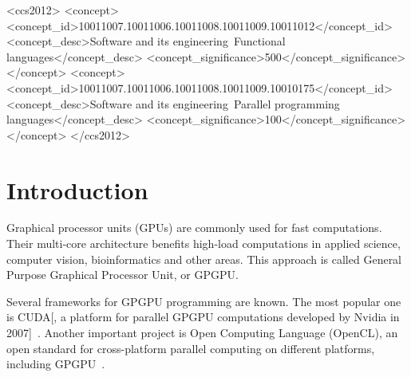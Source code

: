 \documentclass[sigplan,review]{acmart}\settopmatter{printfolios=true}
\begin{document}
\begin{CCSXML}
<ccs2012>
<concept>
<concept_id>10011007.10011006.10011008.10011009.10011012</concept_id>
<concept_desc>Software and its engineering~Functional languages</concept_desc>
<concept_significance>500</concept_significance>
</concept>
<concept>
<concept_id>10011007.10011006.10011008.10011009.10010175</concept_id>
<concept_desc>Software and its engineering~Parallel programming languages</concept_desc>
<concept_significance>100</concept_significance>
</concept>
</ccs2012>
\end{CCSXML}




\maketitle


\section{Introduction}

Graphical processor units (GPUs) are commonly used for fast computations. Their multi-core architecture benefits high-load computations in applied science, computer vision, bioinformatics and other areas. This approach is called General Purpose Graphical Processor Unit, or GPGPU.~\cite{CUDA_to_OpenCL, GPGPU_1}

Several frameworks for GPGPU programming are known. The most popular one is CUDA[, a platform for parallel GPGPU computations developed by Nvidia in 2007]~\cite{CUDA}. Another important project is Open Computing Language (OpenCL), an open standard for cross-platform parallel computing on different platforms, including GPGPU~\cite{OpenCL}.
\end{document}

